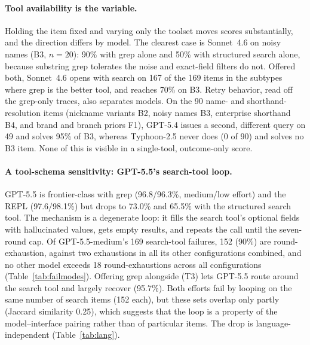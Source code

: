 \documentclass[11pt]{article}
\begin{document}
\paragraph{Tool availability is the variable.} Holding the item fixed and varying only the toolset moves
scores substantially, and the direction differs by model. The clearest case is Sonnet~4.6 on noisy names (B3,
$n=20$): 90\% with grep alone and 50\% with structured search alone, because substring grep tolerates
the noise and exact-field filters do not. Offered both, Sonnet~4.6 opens with search on 167 of the 169 items in the
subtypes where grep is the better tool, and reaches 70\% on B3. Retry behavior, read off the grep-only traces, also separates models. On the 90 name- and
shorthand-resolution items (nickname variants B2, noisy names B3, enterprise shorthand B4, and brand and
branch priors F1), GPT-5.4 issues a second, different query on 49 and solves
95\% of B3, whereas Typhoon-2.5 never does (0 of 90) and solves no B3 item. None of this is visible in a
single-tool, outcome-only score.

\paragraph{A tool-schema sensitivity: GPT-5.5's search-tool loop.} GPT-5.5 is frontier-class with grep
(96.8/96.3\%, medium/low effort) and the REPL (97.6/98.1\%) but drops to 73.0\% and 65.5\% with the
structured search tool. The mechanism is a degenerate loop: it fills the search tool's optional fields
with hallucinated values, gets empty results, and repeats the call until the seven-round cap. Of
GPT-5.5-medium's 169 search-tool failures, 152 (90\%) are round-exhaustion, against two exhaustions in all
its other configurations combined, and no other model exceeds 18 round-exhaustions across all
configurations (Table~\ref{tab:failmodes}). Offering grep alongside (T3) lets GPT-5.5 route around the
search tool and largely recover (95.7\%). Both efforts fail by looping on the same number of search items (152 each),
but these sets overlap only partly (Jaccard similarity 0.25), which suggests that the loop is a property of the model--interface pairing rather
than of particular items. The drop is language-independent (Table~\ref{tab:lang}).

\begin{table}[t]
\centering
\small

\caption{Accuracy (\%) on English and Thai items, pooled over the four tool configurations. $\Delta$ is
the mean over subtypes of (TH $-$ EN), restricted to the 26 subtypes with at least five items in each
language; negative values mean a Thai penalty. Code-switched items are excluded.}
\label{tab:lang}
\end{table}
\end{document}
